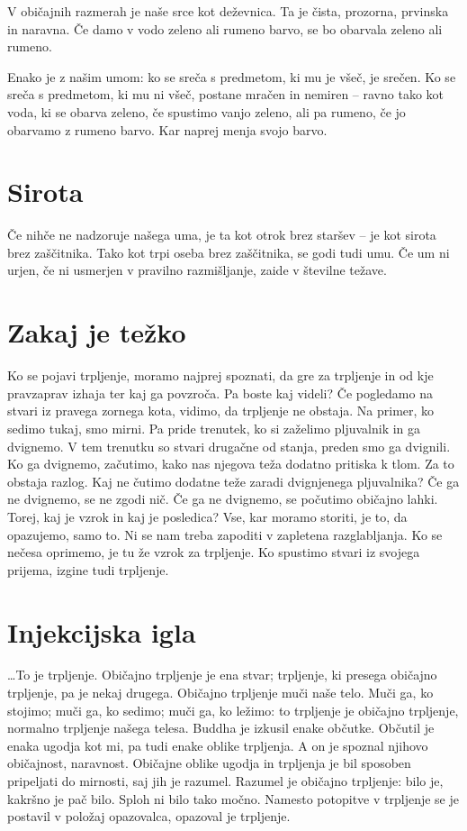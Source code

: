 V običajnih razmerah je naše srce kot deževnica. Ta je čista, prozorna, prvinska in naravna. Če damo v vodo zeleno ali rumeno barvo, se bo obarvala zeleno ali rumeno.

Enako je z našim umom: ko se sreča s predmetom, ki mu je všeč, je srečen. Ko se sreča s predmetom, ki mu ni všeč, postane mračen in nemiren – ravno tako kot voda, ki se obarva zeleno, če spustimo vanjo zeleno, ali pa rumeno, če jo obarvamo z rumeno barvo. Kar naprej menja svojo barvo.

\section{Sirota}

Če nihče ne nadzoruje našega uma, je ta kot otrok brez staršev – je kot sirota brez zaščitnika. Tako kot trpi oseba brez zaščitnika, se godi tudi umu. Če um ni urjen, če ni usmerjen v pravilno razmišljanje, zaide v številne težave.

\section{Zakaj je težko}

Ko se pojavi trpljenje, moramo najprej spoznati, da gre za trpljenje in od kje pravzaprav izhaja ter kaj ga povzroča. Pa boste kaj videli? Če pogledamo na stvari iz pravega zornega kota, vidimo, da trpljenje ne obstaja. Na primer, ko sedimo tukaj, smo mirni. Pa pride trenutek, ko si zaželimo pljuvalnik in ga dvignemo. V tem trenutku so stvari drugačne od stanja, preden smo ga dvignili. Ko ga dvignemo, začutimo, kako nas njegova teža dodatno pritiska k tlom. Za to obstaja razlog. Kaj ne čutimo dodatne teže zaradi dvignjenega pljuvalnika? Če ga ne dvignemo, se ne zgodi nič. Če ga ne dvignemo, se počutimo običajno lahki. Torej, kaj je vzrok in kaj je posledica? Vse, kar moramo storiti, je to, da opazujemo, samo to. Ni se nam treba zapoditi v zapletena razglabljanja. Ko se nečesa oprimemo, je tu že vzrok za trpljenje. Ko spustimo stvari iz svojega prijema, izgine tudi trpljenje.

\section{Injekcijska igla}

\ldots{}To je trpljenje. Običajno trpljenje je ena stvar; trpljenje, ki presega običajno trpljenje, pa je nekaj drugega. Običajno trpljenje muči naše telo. Muči ga, ko stojimo; muči ga, ko sedimo; muči ga, ko ležimo: to trpljenje je običajno trpljenje, normalno trpljenje našega telesa. Buddha je izkusil enake občutke. Občutil je enaka ugodja kot mi, pa tudi enake oblike trpljenja. A on je spoznal njihovo običajnost, naravnost. Običajne oblike ugodja in trpljenja je bil sposoben pripeljati do mirnosti, saj jih je razumel. Razumel je običajno trpljenje: bilo je, kakršno je pač bilo. Sploh ni bilo tako močno. Namesto potopitve v trpljenje se je postavil v položaj opazovalca, opazoval je trpljenje.

